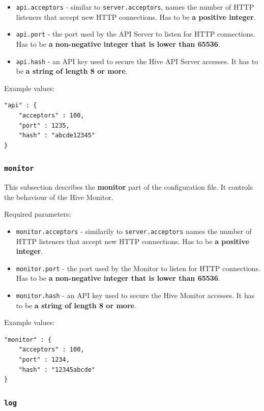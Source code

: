 \documentclass[a4paper]{article}
\begin{document}
\begin{itemize}
\item \texttt{api.acceptors} - similar to \texttt{server.acceptors}, names the number of HTTP listeners that accept new HTTP connections. Has to be \textbf{a positive integer}.
\item \texttt{api.port} - the port used by the API Server to listen for HTTP connections. Has to be \textbf{a non-negative integer that is lower than 65536}.
\item \texttt{api.hash} - an API key used to secure the Hive API Server accesses. It has to be \textbf{a string of length 8 or more}.
\end{itemize}

\noindent
Example values:

\begin{verbatim}
"api" : {
    "acceptors" : 100,
    "port" : 1235,
    "hash" : "abcde12345"
}
\end{verbatim}
\subsubsection{\texttt{monitor}}
\label{sec-3-1-7}
\label{ref-monitor_config}

This subsection describes the \textbf{monitor} part of the configuration file. It controls the behaviour of the Hive Monitor.

\noindent
Required parameters:

\begin{itemize}
\item \texttt{monitor.acceptors} - similarily to \texttt{server.acceptors} names the number of HTTP listeners that accept new HTTP connections. Has to be \textbf{a positive integer}.
\item \texttt{monitor.port} - the port used by the Monitor to listen for HTTP connections. Has to be \textbf{a non-negative integer that is lower than 65536}.
\item \texttt{monitor.hash} - an API key used to secure the Hive Monitor accesses. It has to be \textbf{a string of length 8 or more}.
\end{itemize}

\noindent
Example values:


\begin{verbatim}
"monitor" : {
    "acceptors" : 100,
    "port" : 1234,
    "hash" : "12345abcde"
}
\end{verbatim}
\subsubsection{\texttt{log}}
\label{sec-3-1-8}
\label{ref-log-config}
\end{document}

